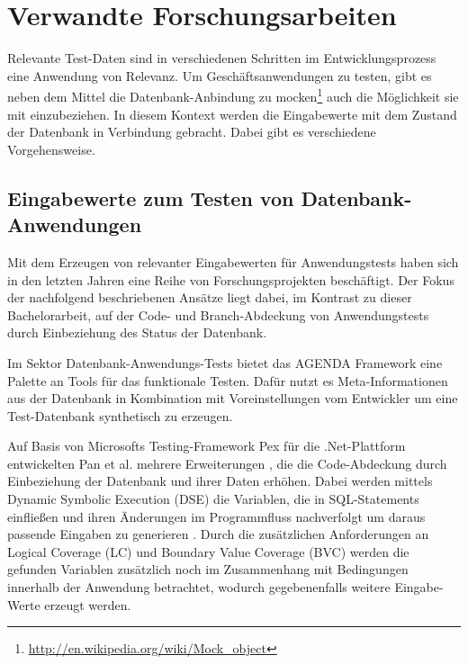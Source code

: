 \section{Verwandte Forschungsarbeiten}\label{chap:relatedwork}

%
%

Relevante Test-Daten sind in verschiedenen Schritten im Entwicklungsprozess eine Anwendung von Relevanz.
Um Geschäftsanwendungen zu testen, gibt es neben dem Mittel die Datenbank-Anbindung zu mocken\footnote{\url{http://en.wikipedia.org/wiki/Mock_object}} auch die Möglichkeit sie mit einzubeziehen.
In diesem Kontext werden die Eingabewerte mit dem Zustand der Datenbank in Verbindung gebracht.
Dabei gibt es verschiedene Vorgehensweise.

\subsection{Eingabewerte zum Testen von Datenbank-Anwendungen}
Mit dem Erzeugen von relevanter Eingabewerten für Anwendungstests haben sich in den letzten Jahren eine Reihe von Forschungsprojekten beschäftigt.
Der Fokus der nachfolgend beschriebenen Ansätze liegt dabei, im Kontrast zu dieser Bachelorarbeit, auf der Code- und Branch-Abdeckung von Anwendungstests durch Einbeziehung des Status der Datenbank.

Im Sektor Datenbank-Anwendungs-Tests bietet das AGENDA Framework \cite{Chays:2000:FTD:347324.348954, Chays:2004:TDG:997669, Chays:2004:ATR:1077269.1077271, Deng:2005:TDT:1062455.1062486, Chays:2008:QTG:1385269.1385277} eine Palette an Tools für das funktionale Testen.
Dafür nutzt es Meta-Informationen aus der Datenbank in Kombination mit Voreinstellungen vom Entwickler um eine Test-Datenbank synthetisch zu erzeugen.

Auf Basis von Microsofts Testing-Framework Pex für die .Net-Plattform \cite{Tillmann:2008:PWB:1792786.1792798} entwickelten Pan et al. mehrere Erweiterungen \cite{Pan:2011:GPI:2190078.2190154, Pan:2011:DSG:1988842.1988846}, die die Code-Abdeckung durch Einbeziehung der Datenbank und ihrer Daten erhöhen.
Dabei werden mittels Dynamic Symbolic Execution (DSE) \cite{Cadar:2006:EAG:1180405.1180445, Godefroid:2005:DDA:1065010.1065036} die Variablen, die in SQL-Statements einfließen und ihren Änderungen im Programmfluss nachverfolgt um daraus passende Eingaben zu generieren \cite{Pan:2011:GPI:2190078.2190154}.
Durch die zusätzlichen Anforderungen an Logical Coverage (LC) \cite{DBLP:conf/issre/AmmannOH03} und Boundary Value Coverage (BVC) \cite{DBLP:conf/issre/KosmatovLPU04} werden die gefunden Variablen zusätzlich noch im Zusammenhang mit Bedingungen innerhalb der Anwendung betrachtet, wodurch gegebenenfalls weitere Eingabe-Werte erzeugt werden. 

